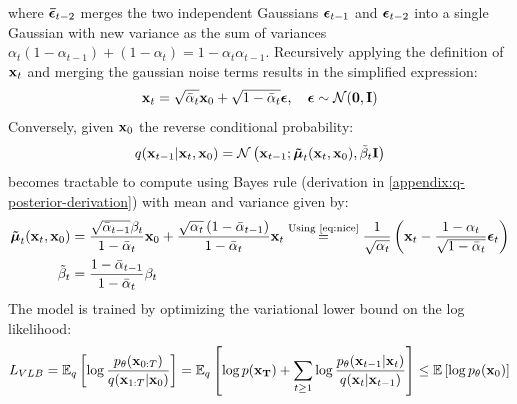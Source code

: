 where $\boldsymbol{\mathbf{\bar{\epsilon}}}_{t-2}$ merges the two independent Gaussians $\boldsymbol{\mathbf{\epsilon}}_{t-1}$ and $\boldsymbol{\mathbf{\epsilon}}_{t-2}$ into a single Gaussian with new variance as the sum of variances $\alpha_t (1 - \alpha_{t-1}) + (1 - \alpha_{t}) = 1 - \alpha_t \alpha_{t-1}$. Recursively applying the definition of $\boldsymbol{\mathbf{x}}_t$ and merging the gaussian noise terms results in the simplified expression:
\begin{equation} \label{eq:nice}
    \boldsymbol{\mathbf{x}}_t = \sqrt{\bar{\alpha}_t}\boldsymbol{\mathbf{x}}_0 + \sqrt{1 - \bar{\alpha}_t} \boldsymbol{\mathbf{\epsilon}}, \quad \boldsymbol{\mathbf{\epsilon}} \sim \mathcal{N}(\boldsymbol{\mathbf{0}}, \boldsymbol{\mathbf{I}})
\end{equation}
Conversely, given $\boldsymbol{\mathbf{x}}_0$ the reverse conditional probability:
\begin{equation*}
    q(\boldsymbol{\mathbf{x}}_{t-1} \vert \boldsymbol{\mathbf{x}}_t, \boldsymbol{\mathbf{x}}_0) = \mathcal{N}\left( \boldsymbol{\mathbf{x}}_{t-1}; \boldsymbol{\mathbf{\tilde{\mu}}}_t(\boldsymbol{\mathbf{x}}_t, \boldsymbol{\mathbf{x}}_0), \tilde{\beta}_t \boldsymbol{\mathbf{I}} \right)
\end{equation*}
becomes tractable to compute using Bayes rule (derivation in \cref{appendix:q-posterior-derivation}) with mean and variance given by:
\begin{align} \label{eq:x-t-min-1-from-x-t}
    \boldsymbol{\mathbf{\tilde{\mu}}}_t(\boldsymbol{\mathbf{x}}_t, \boldsymbol{\mathbf{x}}_0) &= \frac{\sqrt{\bar{\alpha}_{t-1}} \beta_t}{1-\bar{\alpha}_t} \boldsymbol{\mathbf{x}}_0+\frac{\sqrt{\alpha_t}\left(1-\bar{\alpha}_{t-1}\right)}{1-\bar{\alpha}_t} \boldsymbol{\mathbf{x}}_t \overset{\text{Using \ref{eq:nice}}}{=} \frac{1}{\sqrt{\alpha_t}}\left(\boldsymbol{\mathbf{x}}_t-\frac{1-\alpha_t}{\sqrt{1-\bar{\alpha}_t}} \boldsymbol{\mathbf{\epsilon}}_t\right) \\
    \tilde{\beta}_t &= \frac{1-\bar{\alpha}_{t-1}}{1-\bar{\alpha}_t} \beta_t
\end{align}
The model is trained by optimizing the variational lower bound on the log likelihood:
\begin{equation}
    L_{VLB}
        = \mathbb{E}_q\left[ \log \frac{p_\theta(\boldsymbol{\mathbf{x}}_{0:T})}{q(\boldsymbol{\mathbf{x}}_{1:T} \vert \boldsymbol{\mathbf{x}}_0)}\right]
        = \mathbb{E}_q\left[\log p(\boldsymbol{\mathbf{x_T}}) + \sum_{t \geq 1} \log \frac{p_\theta(\boldsymbol{\mathbf{x}}_{t-1} \vert \boldsymbol{\mathbf{x}}_{t})}{q(\boldsymbol{\mathbf{x}}_t \vert \boldsymbol{\mathbf{x}}_{t-1})}
        \right]
        \leq \mathbb{E}\left[\log p_\theta(\boldsymbol{\mathbf{x}}_0)\right]
\end{equation}
